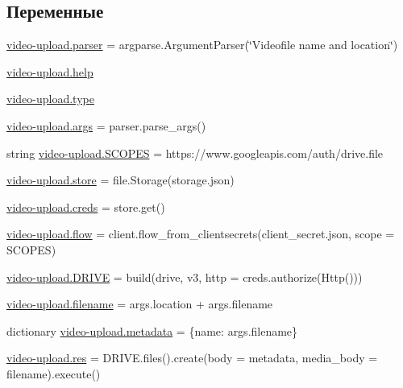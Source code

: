 \subsection*{Переменные}
\begin{DoxyCompactItemize}
\item 
\hyperlink{namespacevideo-upload_adb444a75aaa0c0e590807701931bafef}{video-\/upload.\+parser} = argparse.\+Argument\+Parser(\char`\"{}Videofile name and location\char`\"{})
\item 
\hyperlink{namespacevideo-upload_a7febd43c5f8604092229ae1ccf261f0c}{video-\/upload.\+help}
\item 
\hyperlink{namespacevideo-upload_a0aea8bad307fcc1764683855862406c5}{video-\/upload.\+type}
\item 
\hyperlink{namespacevideo-upload_a9e790ab261c9413ed47dafe46c022063}{video-\/upload.\+args} = parser.\+parse\+\_\+args()
\item 
string \hyperlink{namespacevideo-upload_a76e331163a34b55da69ecdf6ca084eab}{video-\/upload.\+S\+C\+O\+P\+ES} = \textquotesingle{}https\+://www.\+googleapis.\+com/auth/drive.\+file\textquotesingle{}
\item 
\hyperlink{namespacevideo-upload_a1bbb99b1568829c7cb6af40564c671d3}{video-\/upload.\+store} = file.\+Storage(\textquotesingle{}storage.\+json\textquotesingle{})
\item 
\hyperlink{namespacevideo-upload_a5c691a1aa9c397a8485738b164fbf511}{video-\/upload.\+creds} = store.\+get()
\item 
\hyperlink{namespacevideo-upload_a7f676962b30f842d93805a11467d4404}{video-\/upload.\+flow} = client.\+flow\+\_\+from\+\_\+clientsecrets(\textquotesingle{}client\+\_\+secret.\+json\textquotesingle{}, scope = S\+C\+O\+P\+ES)
\item 
\hyperlink{namespacevideo-upload_a70c1c74c0d69dbc8748f55e9678bd7e8}{video-\/upload.\+D\+R\+I\+VE} = build(\textquotesingle{}drive\textquotesingle{}, \textquotesingle{}v3\textquotesingle{}, http = creds.\+authorize(Http()))
\item 
\hyperlink{namespacevideo-upload_a8f0c224b0d6326d66b6a471fb3ae06b7}{video-\/upload.\+filename} = args.\+location + args.\+filename
\item 
dictionary \hyperlink{namespacevideo-upload_a078e77756bf147602ea81c2485e0b3ca}{video-\/upload.\+metadata} = \{\textquotesingle{}name\textquotesingle{}\+: args.\+filename\}
\item 
\hyperlink{namespacevideo-upload_a98d77aa7929949660affdd840263f994}{video-\/upload.\+res} = D\+R\+I\+V\+E.\+files().create(body = metadata, media\+\_\+body = filename).execute()
\end{DoxyCompactItemize}
